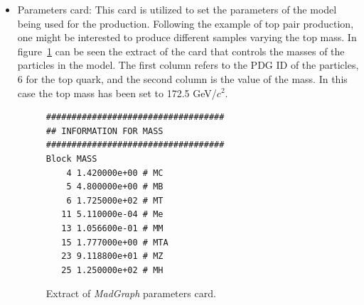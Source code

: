 \begin{itemize}
\begin{itemize}
    \item Parameters card: This card is utilized to set the parameters of the model being used for the production. Following the example of top pair production, one might be interested to produce different samples varying the top mass. In figure~\ref{fig:ParamCard} can be seen the extract of the card that controls the masses of the particles in the model. The first column refers to the PDG ID of the particles, 6 for the top quark, and the second column is the value of the mass. In this case the top mass has been set to 172.5 GeV/$c^{2}$.
    \begin{figure}[!Hhtbp]
      \begin{center}
        \begin{minipage}[c]{0.45\textwidth}
\begin{verbatim}
###################################
## INFORMATION FOR MASS
###################################
Block MASS 
    4 1.420000e+00 # MC 
    5 4.800000e+00 # MB 
    6 1.725000e+02 # MT 
   11 5.110000e-04 # Me 
   13 1.056600e-01 # MM 
   15 1.777000e+00 # MTA 
   23 9.118800e+01 # MZ 
   25 1.250000e+02 # MH 
\end{verbatim}
        \end{minipage}
          \caption{Extract of \textit{MadGraph} parameters card.}
          \label{fig:ParamCard}
      \end{center}
    \end{figure}


\end{itemize}
\end{itemize}
